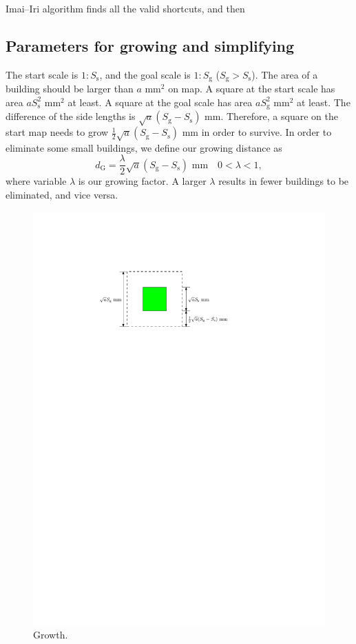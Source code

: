 \documentclass[graybox]{svmult}
\begin{document}
Imai--Iri algorithm finds all the valid shortcuts, and then 


\subsection{Parameters for growing and simplifying}
The start scale is $1:S_\mathrm{s}$, and the goal scale is $1:S_\mathrm{g}$ 
($S_\mathrm{g}>S_\mathrm{s}$).
The area of a building should be larger than $a$ mm$^2$ on map.
A square at the start scale has area $a S_\mathrm{s}^2$ mm$^2$ at least.
A square at the goal scale has area $a S_\mathrm{g}^2$ mm$^2$ at least.
The difference of the side lengths is $\sqrt{a} (S_\mathrm{g}-S_\mathrm{s})$ 
mm.
Therefore, a square on the start map needs to grow $\frac{1}{2}\sqrt{a} 
(S_\mathrm{g}-S_\mathrm{s})$ mm in order to survive.
In order to eliminate some small buildings, we define our growing distance as
\begin{equation}
\label{eq:d_G}
	d_\mathrm{G}=\frac{\lambda}{2}\sqrt{a} (S_\mathrm{g}-S_\mathrm{s}) \text{ 
	mm} \quad 0 < \lambda <1,
\end{equation}
where variable $\lambda$ is our growing factor. A larger $\lambda$ results in  
fewer buildings to be eliminated, and vice versa.

\begin{figure}[tb]
	\centering
	\includegraphics{Growth}
	\caption{Growth.}
	\label{fig:Growth}
\end{figure}
\end{document}
